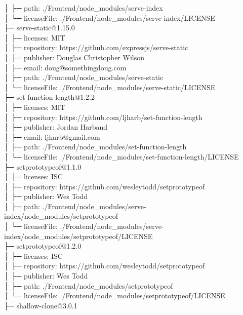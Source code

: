 \documentclass[
    paper=a4,
    twoside=false,
    parskip=half,
    listof=entryprefix,
    listof=totoc,
    index=totoc,
    bibliography=totoc,
    headsepline,
]{scrbook}
\begin{document}
    │  ├─ path: ./Frontend/node\_modules/serve-index\\
    │  └─ licenseFile: ./Frontend/node\_modules/serve-index/LICENSE\\
    ├─ serve-static@1.15.0\\
    │  ├─ licenses: MIT\\
    │  ├─ repository: https://github.com/expressjs/serve-static\\
    │  ├─ publisher: Douglas Christopher Wilson\\
    │  ├─ email: doug@somethingdoug.com\\
    │  ├─ path: ./Frontend/node\_modules/serve-static\\
    │  └─ licenseFile: ./Frontend/node\_modules/serve-static/LICENSE\\
    ├─ set-function-length@1.2.2\\
    │  ├─ licenses: MIT\\
    │  ├─ repository: https://github.com/ljharb/set-function-length\\
    │  ├─ publisher: Jordan Harband\\
    │  ├─ email: ljharb@gmail.com\\
    │  ├─ path: ./Frontend/node\_modules/set-function-length\\
    │  └─ licenseFile: ./Frontend/node\_modules/set-function-length/LICENSE\\
    ├─ setprototypeof@1.1.0\\
    │  ├─ licenses: ISC\\
    │  ├─ repository: https://github.com/wesleytodd/setprototypeof\\
    │  ├─ publisher: Wes Todd\\
    │  ├─ path: ./Frontend/node\_modules/serve-index/node\_modules/setprototypeof\\
    │  └─ licenseFile: ./Frontend/node\_modules/serve-index/node\_modules/setprototypeof/LICENSE\\
    ├─ setprototypeof@1.2.0\\
    │  ├─ licenses: ISC\\
    │  ├─ repository: https://github.com/wesleytodd/setprototypeof\\
    │  ├─ publisher: Wes Todd\\
    │  ├─ path: ./Frontend/node\_modules/setprototypeof\\
    │  └─ licenseFile: ./Frontend/node\_modules/setprototypeof/LICENSE\\
    ├─ shallow-clone@3.0.1\\
\end{document}
